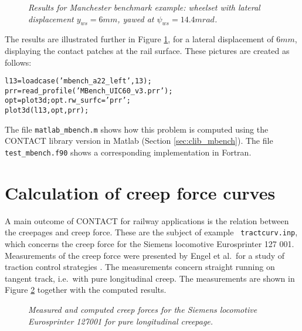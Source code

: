 \documentclass[12pt]{report}
\begin{document}
\begin{figure}[bt]
\centering
{}
\caption{\em Results for Manchester benchmark example: wheelset with
lateral displacement $y_{ws}=6\unit{mm}$, yawed at $\psi_{ws}=14.4\unit{mrad}$.}
\label{fig:mbench_prr}
\end{figure}

The results are illustrated further in Figure \ref{fig:mbench_prr}, for a
lateral displacement of $6\unit{mm}$, displaying the contact patches at the rail
surface. These pictures are created as follows:
\begin{alltt}\small
l13 = loadcase('mbench_a22_left',13);
prr = read_profile('MBench_UIC60_v3.prr');
opt = plot3d; opt.rw_surfc = 'prr';
plot3d(l13, opt, prr);
\end{alltt}
\color{black}

The file {\tt matlab\_mbench.m} shows how this problem is computed
using the CONTACT library version in Matlab (Section
\ref{sec:clib_mbench}). The file {\tt test\_mbench.f90} shows a
corresponding implementation in Fortran.

\section{Calculation of creep force curves}
\label{sec:ex_tractcurv}

A main outcome of CONTACT for railway applications is the relation between
the creepages and creep force. These are the subject of example {\tt
tractcurv.inp}, which concerns the creep force for the Siemens locomotive
Eurosprinter 127 001. Measurements of the creep force were presented by
Engel et al.\ for a study of traction control strategies \cite{Engel1998}.
The measurements concern straight running on tangent track, i.e.\ with pure
longitudinal creep. The measurements are shown in Figure
\ref{fig:tractcurv} together with the computed results.

\begin{figure}[bt]
\centering
{}
\caption{\em Measured and computed creep forces for the Siemens locomotive
Eurosprinter 127001 for pure longitudinal creepage.}
\label{fig:tractcurv}
\end{figure}
\end{document}
